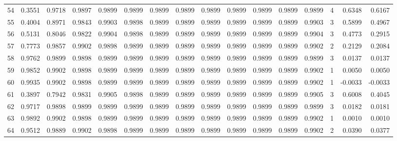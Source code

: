 \begin{tabular}{lrrrrrrrrrrrrrrr}
54  &      0.3551 &  0.9718 &  0.9897 &  0.9899 &  0.9899 &  0.9899 &  0.9899 &  0.9899 &  0.9899 &  0.9899 &   0.9899 &     0.9899 &      4 &                    0.6348 &                     0.6167 \\
55  &      0.4004 &  0.8971 &  0.9843 &  0.9903 &  0.9898 &  0.9899 &  0.9899 &  0.9899 &  0.9899 &  0.9899 &   0.9899 &     0.9903 &      3 &                    0.5899 &                     0.4967 \\
56  &      0.5131 &  0.8046 &  0.9822 &  0.9904 &  0.9898 &  0.9899 &  0.9899 &  0.9899 &  0.9899 &  0.9899 &   0.9899 &     0.9904 &      3 &                    0.4773 &                     0.2915 \\
57  &      0.7773 &  0.9857 &  0.9902 &  0.9898 &  0.9899 &  0.9899 &  0.9899 &  0.9899 &  0.9899 &  0.9899 &   0.9899 &     0.9902 &      2 &                    0.2129 &                     0.2084 \\
58  &      0.9762 &  0.9899 &  0.9898 &  0.9899 &  0.9899 &  0.9899 &  0.9899 &  0.9899 &  0.9899 &  0.9899 &   0.9899 &     0.9899 &      3 &                    0.0137 &                     0.0137 \\
59  &      0.9852 &  0.9902 &  0.9898 &  0.9899 &  0.9899 &  0.9899 &  0.9899 &  0.9899 &  0.9899 &  0.9899 &   0.9899 &     0.9902 &      1 &                    0.0050 &                     0.0050 \\
60  &      0.9935 &  0.9902 &  0.9898 &  0.9899 &  0.9899 &  0.9899 &  0.9899 &  0.9899 &  0.9899 &  0.9899 &   0.9899 &     0.9902 &      1 &                   -0.0033 &                    -0.0033 \\
61  &      0.3897 &  0.7942 &  0.9831 &  0.9905 &  0.9898 &  0.9899 &  0.9899 &  0.9899 &  0.9899 &  0.9899 &   0.9899 &     0.9905 &      3 &                    0.6008 &                     0.4045 \\
62  &      0.9717 &  0.9898 &  0.9899 &  0.9899 &  0.9899 &  0.9899 &  0.9899 &  0.9899 &  0.9899 &  0.9899 &   0.9899 &     0.9899 &      3 &                    0.0182 &                     0.0181 \\
63  &      0.9892 &  0.9902 &  0.9898 &  0.9899 &  0.9899 &  0.9899 &  0.9899 &  0.9899 &  0.9899 &  0.9899 &   0.9899 &     0.9902 &      1 &                    0.0010 &                     0.0010 \\
64  &      0.9512 &  0.9889 &  0.9902 &  0.9898 &  0.9899 &  0.9899 &  0.9899 &  0.9899 &  0.9899 &  0.9899 &   0.9899 &     0.9902 &      2 &                    0.0390 &                     0.0377 \\

\end{tabular}
